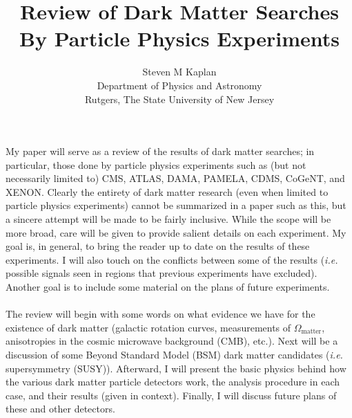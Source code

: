 \documentclass{article}
\begin{document}
\title{Review of Dark Matter Searches By Particle Physics Experiments}
\author{Steven M Kaplan\\Department of Physics and Astronomy\\Rutgers, The State University of New Jersey}
\date{}

\maketitle
\nocite{cmsMonojet,cmsGammaPlusMET,BertoneBook,Buckley2011216,PhysRevD.33.3495} %
My paper will serve as a review of the results of dark matter searches; in particular, those done by particle physics experiments such as (but not necessarily limited to) CMS, ATLAS, DAMA, PAMELA, CDMS, CoGeNT, and XENON.  Clearly the entirety of dark matter research (even when limited to particle physics experiments) cannot be summarized in a paper such as this, but a sincere attempt will be made to be fairly inclusive.  While the scope will be more broad, care will be given to provide salient details on each experiment.  My goal is, in general, to bring the reader up to date on the results of these experiments.  I will also touch on the conflicts between some of the results (\emph{i.e.} possible signals seen in regions that previous experiments have excluded).  Another goal is to include some material on the plans of future experiments.
\\ \\
The review will begin with some words on what evidence we have for the existence of dark matter (galactic rotation curves, measurements of $\Omega_{\mathrm{matter}}$, anisotropies in the cosmic microwave background (CMB), etc.).  Next will be a discussion of some Beyond Standard Model (BSM) dark matter candidates (\emph{i.e.} supersymmetry (SUSY)).  Afterward, I will present the basic physics behind how the various dark matter particle detectors work, the analysis procedure in each case, and their results (given in context).  Finally, I will discuss future plans of these and other detectors.



\end{document}
